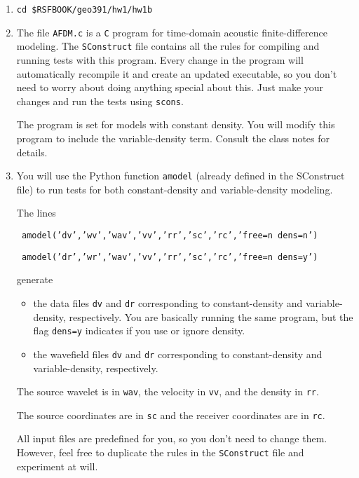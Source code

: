 \begin{enumerate}

\item \texttt{cd \$RSFBOOK/geo391/hw1/hw1b}

\item The file \texttt{AFDM.c} is a \texttt{C} program
for time-domain acoustic finite-difference modeling.
The \texttt{SConstruct} file contains all the rules for compiling and
running tests with this program. Every change in the program will
automatically recompile it and create an updated executable,
so you don't need to worry about doing anything special about this.
Just make your changes and run the tests using \texttt{scons}.

The program is set for models with constant density.
You will modify this program to include the variable-density term.
Consult the class notes for details.

\item
You will use the Python function \texttt{amodel} (already
defined in the SConstruct file) to run tests for both constant-density
and variable-density modeling.

The lines
\par
\texttt{ amodel('dv','wv','wav','vv','rr','sc','rc','free=n dens=n') }
\par
\texttt{ amodel('dr','wr','wav','vv','rr','sc','rc','free=n dens=y') }
\par
generate
\begin{itemize}
\item the data files \texttt{dv} and \texttt{dr} 
corresponding to constant-density
and variable-density, respectively. 
You are basically running the same program, but the flag
\texttt{dens=y} indicates if you use or ignore density.

\item the wavefield files \texttt{dv} and \texttt{dr} 
corresponding to constant-density
and variable-density, respectively. 
\end{itemize}

The source wavelet is in \texttt{wav},
the velocity in \texttt{vv}, and
the density in \texttt{rr}. 

The source coordinates are in \texttt{sc} and
the receiver coordinates are in \texttt{rc}.

All input files are predefined for you, so you don't need to change them.
However, feel free to duplicate the rules in the \texttt{SConstruct} 
file and experiment at will.


\end{enumerate}
